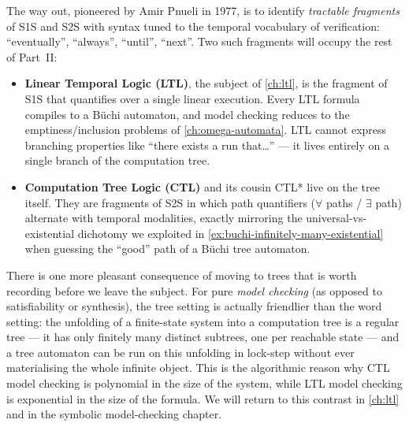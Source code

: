 The way out, pioneered by Amir Pnueli in 1977, is to identify \emph{tractable fragments} of S1S and S2S with syntax tuned to the temporal vocabulary of verification: ``eventually'', ``always'', ``until'', ``next''. Two such fragments will occupy the rest of Part~II:

\begin{itemize}
    \item \textbf{Linear Temporal Logic (LTL)}, the subject of \cref{ch:ltl}, is the fragment of S1S that quantifies over a single linear execution. Every LTL formula compiles to a Büchi automaton, and model checking reduces to the emptiness/inclusion problems of \cref{ch:omega-automata}. LTL cannot express branching properties like ``there exists a run that\dots'' --- it lives entirely on a single branch of the computation tree.
    \item \textbf{Computation Tree Logic (CTL)} and its cousin CTL* live on the tree itself. They are fragments of S2S in which path quantifiers ($\forall$ paths / $\exists$ path) alternate with temporal modalities, exactly mirroring the universal-vs-existential dichotomy we exploited in \cref{ex:buchi-infinitely-many-existential} when guessing the ``good'' path of a Büchi tree automaton.
\end{itemize}


There is one more pleasant consequence of moving to trees that is worth recording before we leave the subject. For pure \emph{model checking} (as opposed to satisfiability or synthesis), the tree setting is actually friendlier than the word setting: the unfolding of a finite-state system into a computation tree is a regular tree --- it has only finitely many distinct subtrees, one per reachable state --- and a tree automaton can be run on this unfolding in lock-step without ever materialising the whole infinite object. This is the algorithmic reason why CTL model checking is polynomial in the size of the system, while LTL model checking is exponential in the size of the formula. We will return to this contrast in \cref{ch:ltl} and in the symbolic model-checking chapter.

